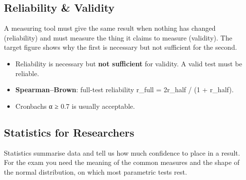 \hypertarget{p1-02--92-reliability--validity}{%
\subsection{Reliability \& Validity}\label{p1-02--92-reliability--validity}}

A measuring tool must give the same result when nothing has changed (reliability) and must measure the
thing it claims to measure (validity). The target figure shows why the first is necessary but not
sufficient for the second.



\begin{itemize}
\tightlist
\item
  Reliability is necessary but \textbf{not sufficient} for validity. A valid test must be reliable.
\item
  \textbf{Spearman--Brown}: full-test reliability r\_full = 2r\_half / (1 + r\_half).
\item
  Cronbach\textquotesingle s α ≥ 0.7 is usually acceptable.
\end{itemize}



\needspace{125pt}

\hypertarget{p1-02--93-statistics-for-researchers}{%
\subsection{Statistics for Researchers}\label{p1-02--93-statistics-for-researchers}}

Statistics summarise data and tell us how much confidence to place in a result. For the exam you need the
meaning of the common measures and the shape of the normal distribution, on which most parametric tests
rest.



\begingroup\small

